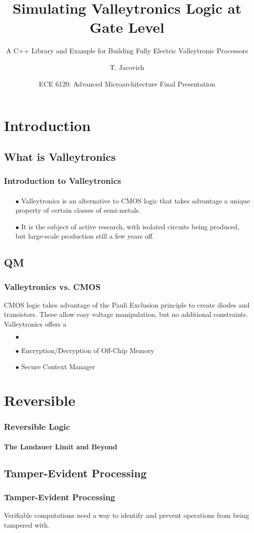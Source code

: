 \documentclass{beamer}
\title[Simulating Valleytronics Logic at the Gate Level] %
{Simulating Valleytronics Logic at Gate Level}
\subtitle{A C++ Library and Example for Building Fully Electric Valleytronic Processors}
\author[Author] %
{T. Jacovich\inst{1}}
\institute[Universities Here and There] %
{
  \inst{1}%
  Department of Physics\\
  The George Washington University
}
\date[AM2018] %
{ECE 6120: Advanced Microarchitecture Final Presentation}
\begin{document}
\frame{\titlepage}
\section[Introduction]{Introduction}
  \subsection[What is Valleytronics]{What is Valleytronics}
  \begin{frame}
    \frametitle{Introduction to Valleytronics}
    \framesubtitle{}
    
\begin{itemize}
  \item[$\bullet$]Valleytronics is an alternative to CMOS logic that takes advantage a unique property of certain classes of semi-metals.
  \vspace*{20pt}
  \item[$\bullet$]It is the subject of active research, with isolated circuits being produced, but large-scale production still a few years off.
\end{itemize}


  \end{frame}
    \subsection[Warning: Quantum Physics]{QM}
  \begin{frame}
    \frametitle{Valleytronics vs. CMOS}
    \small CMOS logic takes advantage of the Pauli Exclusion principle to create diodes and transistors. These allow easy voltage manipulation, but no additional constraints. Valleytronics offers a
    \begin{itemize}
  \item[$\bullet$] 
  
  \item[$\bullet$] Encryption/Decryption of Off-Chip Memory
  
  \item[$\bullet$] Secure Context Manager
\end{itemize}
\vspace*{20pt}
 
\vspace*{20pt}
  \end{frame}
  
\section[Reversible Logic]{Reversible}
\begin{frame}
\frametitle{Reversible Logic}
\framesubtitle{The Landauer Limit and Beyond}


\end{frame}
\subsection[Tamper-Evident Processing]{Tamper-Evident Processing}
\begin{frame}
\frametitle{Tamper-Evident Processing}
Verifiable computations need a way to identify and prevent operations from being tampered with. 


\end{frame}
\end{document}
